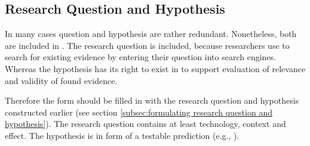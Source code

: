 
\subsection{Research Question and Hypothesis}
\label{subsec:research question and hypothesis}

In many cases  question and hypothesis  are rather redundant. Nonetheless, both are included in \briefingform. The research question is included, because researchers use to search for existing evidence by entering their question into search engines. 
Whereas the hypothesis has its right to exist in \briefingform to support evaluation of relevance and validity of found evidence. 

Therefore the form should be filled in with the research question and hypothesis constructed earlier (see section \ref{subsec:formulating research question and hypothesis}). The research question contains at least technology, context and effect. The hypothesis is in form of a testable prediction (e.g.,  \cite{Buddies2010}).
